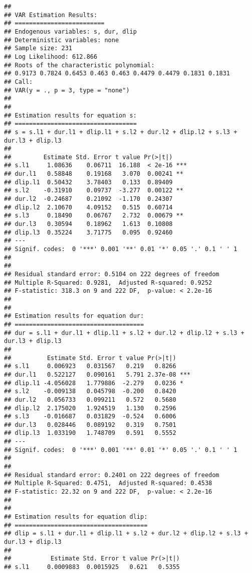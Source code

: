 \documentclass[]{article}
\begin{document}
\begin{verbatim}
## 
## VAR Estimation Results:
## ========================= 
## Endogenous variables: s, dur, dlip 
## Deterministic variables: none 
## Sample size: 231 
## Log Likelihood: 612.866 
## Roots of the characteristic polynomial:
## 0.9173 0.7824 0.6453 0.463 0.463 0.4479 0.4479 0.1831 0.1831
## Call:
## VAR(y = ., p = 3, type = "none")
## 
## 
## Estimation results for equation s: 
## ================================== 
## s = s.l1 + dur.l1 + dlip.l1 + s.l2 + dur.l2 + dlip.l2 + s.l3 + dur.l3 + dlip.l3 
## 
##         Estimate Std. Error t value Pr(>|t|)    
## s.l1     1.08636    0.06711  16.188  < 2e-16 ***
## dur.l1   0.58848    0.19168   3.070  0.00241 ** 
## dlip.l1  0.50432    3.78403   0.133  0.89409    
## s.l2    -0.31910    0.09737  -3.277  0.00122 ** 
## dur.l2  -0.24687    0.21092  -1.170  0.24307    
## dlip.l2  2.10670    4.09152   0.515  0.60714    
## s.l3     0.18490    0.06767   2.732  0.00679 ** 
## dur.l3   0.30594    0.18962   1.613  0.10808    
## dlip.l3  0.35224    3.71775   0.095  0.92460    
## ---
## Signif. codes:  0 '***' 0.001 '**' 0.01 '*' 0.05 '.' 0.1 ' ' 1
## 
## 
## Residual standard error: 0.5104 on 222 degrees of freedom
## Multiple R-Squared: 0.9281,  Adjusted R-squared: 0.9252 
## F-statistic: 318.3 on 9 and 222 DF,  p-value: < 2.2e-16 
## 
## 
## Estimation results for equation dur: 
## ==================================== 
## dur = s.l1 + dur.l1 + dlip.l1 + s.l2 + dur.l2 + dlip.l2 + s.l3 + dur.l3 + dlip.l3 
## 
##          Estimate Std. Error t value Pr(>|t|)    
## s.l1     0.006923   0.031567   0.219   0.8266    
## dur.l1   0.522127   0.090161   5.791 2.37e-08 ***
## dlip.l1 -4.056028   1.779886  -2.279   0.0236 *  
## s.l2    -0.009138   0.045798  -0.200   0.8420    
## dur.l2   0.056733   0.099211   0.572   0.5680    
## dlip.l2  2.175020   1.924519   1.130   0.2596    
## s.l3    -0.016687   0.031829  -0.524   0.6006    
## dur.l3   0.028446   0.089192   0.319   0.7501    
## dlip.l3  1.033190   1.748709   0.591   0.5552    
## ---
## Signif. codes:  0 '***' 0.001 '**' 0.01 '*' 0.05 '.' 0.1 ' ' 1
## 
## 
## Residual standard error: 0.2401 on 222 degrees of freedom
## Multiple R-Squared: 0.4751,  Adjusted R-squared: 0.4538 
## F-statistic: 22.32 on 9 and 222 DF,  p-value: < 2.2e-16 
## 
## 
## Estimation results for equation dlip: 
## ===================================== 
## dlip = s.l1 + dur.l1 + dlip.l1 + s.l2 + dur.l2 + dlip.l2 + s.l3 + dur.l3 + dlip.l3 
## 
##           Estimate Std. Error t value Pr(>|t|)    
## s.l1     0.0009883  0.0015925   0.621   0.5355    

\end{verbatim}
\end{document}

